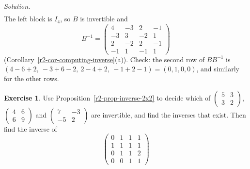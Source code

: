 \documentclass[12pt]{article}
\theoremstyle{definition}
\newtheorem{exercise}{Exercise}
\newenvironment{solution}{\par\noindent\textit{Solution.}\ }{\par\smallskip}
\begin{document}
\begin{solution}
\[\begin{gathered}
\end{gathered}
\]
The left block is \(I_4\), so \(B\) is invertible and
\[
B^{-1}=\begin{pmatrix}4&-3&2&-1\\-3&3&-2&1\\2&-2&2&-1\\-1&1&-1&1\end{pmatrix}
\]
(Corollary~\ref{r2-cor-computing-inverse}(a)). Check: the second row of \(BB^{-1}\) is
\((4-6+2,\ -3+6-2,\ 2-4+2,\ -1+2-1)=(0,1,0,0)\), and similarly for the other rows.
\end{solution}

\begin{exercise}\label{r2-ex-inverses-b}
Use Proposition~\ref{r2-prop-inverse-2x2} to decide which of
\(\left(\begin{smallmatrix}5&3\\3&2\end{smallmatrix}\right)\),
\(\left(\begin{smallmatrix}4&6\\6&9\end{smallmatrix}\right)\) and
\(\left(\begin{smallmatrix}7&-3\\-5&2\end{smallmatrix}\right)\) are invertible, and find
the inverses that exist. Then find the inverse of
\[
\begin{pmatrix}0&1&1&1\\1&1&1&1\\0&1&1&2\\0&0&1&1\end{pmatrix}
\]
\end{exercise}
\end{document}
